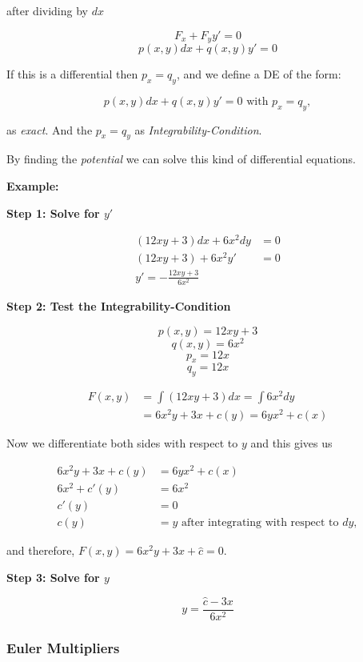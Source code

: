 after dividing by \(dx\)

\[
    F_x + F_y y' = 0
\]
\[
    p(x,y)dx + q(x,y)y' = 0
\]

If this is a differential then \(p_x = q_y\), and we define a DE of the form:

\[
    p(x,y)dx + q(x,y)y' = 0 \text{ with } p_x = q_y,
\]

as \emph{exact}. And the \(p_x = q_y\) as \emph{Integrability-Condition}.

By finding the \emph{potential} we can solve this kind of differential equations.

\textbf{Example:}

\textbf{Step 1: Solve for \(y'\)}

\begin{align*}
    (12xy + 3)dx + 6x^2dy &= 0\\
    (12xy + 3) + 6x^2 y' &= 0\\
    y' = - \frac{12xy + 3}{6x^2}
\end{align*}

\textbf{Step 2: Test the Integrability-Condition}

\[
    p(x,y) = 12xy + 3
\]
\[
    q(x,y) = 6x^2
\] 
\[
    p_x = 12x
\]
\[
    q_y = 12x
\]

\begin{align*}
    F(x,y) &= \int (12xy + 3)dx = \int 6x^2 dy\\
        &= 6x^2 y + 3x + c(y) = 6yx^2 + c(x)
\end{align*}

Now we differentiate both sides with respect to \(y\) and this gives us

\begin{align*}
    6x^2y + 3x + c(y) &= 6yx^2 + c(x) \\
    6x^2 + c'(y) &= 6x^2 \\
           c'(y) &= 0 \\
            c(y) &= y \text{ after integrating with respect to } dy,
\end{align*}

and therefore, \(F(x,y) = 6x^2y + 3x + \hat{c} = 0\).

\textbf{Step 3: Solve for \(y\)}

\[
    y = \frac{\hat{c} - 3x}{6x^2} 
\]

\subsubsection{Euler Multipliers}

